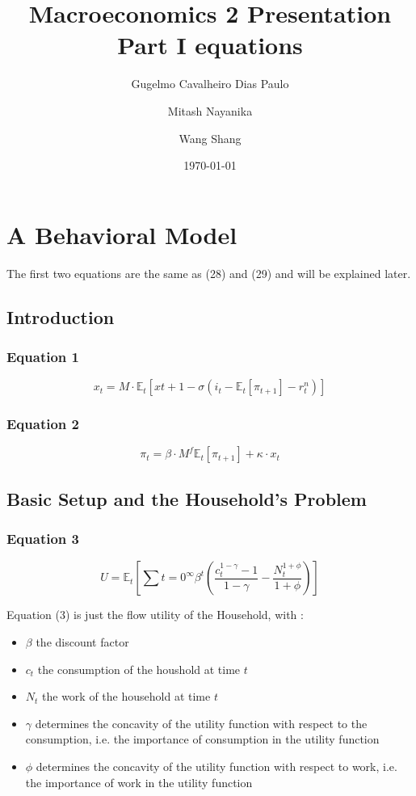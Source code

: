 \documentclass{article}
\title{Macroeconomics 2 Presentation \\ Part I equations}
\author{Gugelmo Cavalheiro Dias Paulo \\ \and Mitash Nayanika \\ \and Wang Shang}
\date{\today}
\begin{document}
\section{A Behavioral Model}
The first two equations are the same as (28) and (29) and will be explained later.

\subsection{Introduction}

\subsubsection*{Equation 1}
\begin{equation}
    x_{t}=M\cdot\mathbb{E}_{t}\left[ x{t+1} -\sigma (i_{t}-\mathbb{E}_{t}\left[\pi_{t+1}\right]-r^{n}_{t})\right]
\end{equation}

\subsubsection*{Equation 2}
\begin{equation}
    \pi_{t}=\beta\cdot M^{f} \mathbb{E}_{t}\left[\pi_{t+1}\right]+\kappa\cdot x_{t}
\end{equation}

\subsection{Basic Setup and the Household’s Problem}

\subsubsection*{Equation 3}
\begin{equation}
    U = \mathbb{E}_{t} \left[ \sum{t=0}^{\infty} \beta^{t}\left(\frac{c_{t}^{1-\gamma}-1}{1-\gamma} - \frac{N_{t}^{1+\phi}}{1+\phi}\right)\right]
\end{equation}

Equation (3) is just the flow utility of the Household, with : 
\begin{itemize}
    \item $\beta$ the discount factor
    \item $c_{t}$ the consumption of the houshold at time $t$
    \item $N_{t}$ the work of the household at time $t$
    \item $\gamma$ determines the concavity of the utility function with respect to the consumption, i.e. the importance of consumption in the utility function
    \item $\phi$ determines the concavity of the utility function with respect to work, i.e. the importance of work in the utility function
\end{itemize}
\end{document}
